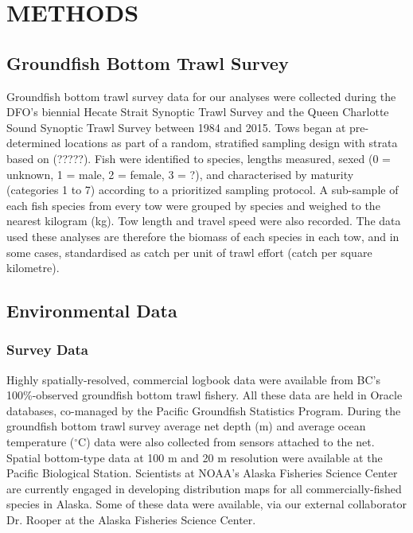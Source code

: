 \documentclass[11pt]{book}\usepackage[]{graphicx}\usepackage[]{color}
\begin{document}
\bigskip

\section{METHODS}
\subsection{Groundfish Bottom Trawl Survey}
Groundfish bottom trawl survey data for our analyses were  collected during the DFO's biennial Hecate Strait Synoptic Trawl Survey and the Queen Charlotte Sound Synoptic Trawl Survey between 1984 and 2015. 
Tows began at pre-determined locations as part of a random, stratified sampling design with strata based on (?????). Fish were identified to species, lengths measured, sexed (0 = unknown, 1 = male, 2 = female, 3 = ?), and characterised by maturity (categories 1 to 7) according to a prioritized sampling protocol. A sub-sample of each fish species from every tow were grouped by species and weighed to the nearest kilogram (kg). Tow length and travel speed were also recorded. The data used these analyses are therefore the biomass of each species in each tow, and in some cases, standardised as catch per unit of trawl effort (catch per square kilometre). 

\subsection{Environmental Data}
\subsubsection{Survey Data}

Highly spatially-resolved, commercial logbook data were available from BC's 100\%-observed groundfish bottom trawl fishery. All these data are held in Oracle databases, co-managed by the Pacific Groundfish Statistics Program. During the groundfish bottom trawl survey average net depth (m) and average ocean temperature ($^\circ$C) data were also collected from sensors attached to the net. Spatial bottom-type data at 100 m and 20 m resolution were available at the Pacific Biological Station. Scientists at NOAA's Alaska Fisheries Science Center are currently engaged in developing distribution maps for all commercially-fished species in Alaska. Some of these data were available, via our external collaborator Dr. Rooper at the Alaska Fisheries Science Center.
\end{document}
